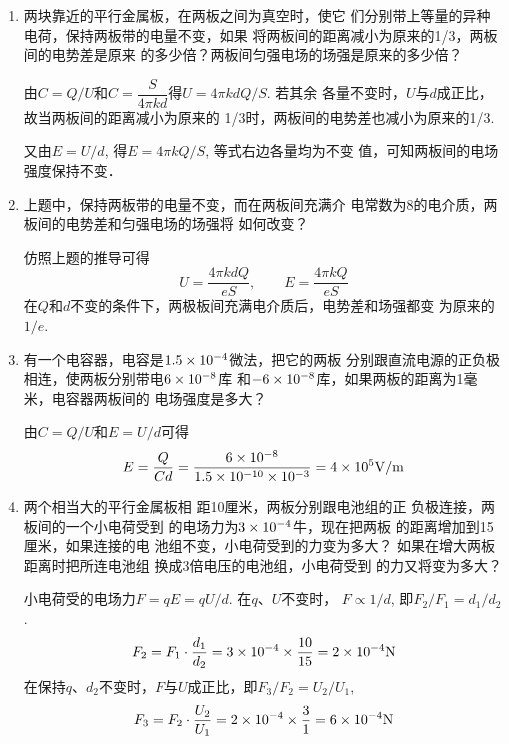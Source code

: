 \begin{enumerate}
\item 两块靠近的平行金属板，在两板之间为真空时，使它
们分别带上等量的异种电荷，保持两板带的电量不变，如果
将两板间的距离减小为原来的1/3，两板间的电势差是原来
的多少倍？两板间匀强电场的场强是原来的多少倍？

\begin{solution}
    由$C=Q/U$和$C=\dfrac{S}{4\pi kd}$得$U=4\pi kdQ/S$. 若其余
    各量不变时，$U$与$d$成正比，故当两板间的距离减小为原来的
    1/3时，两板间的电势差也减小为原来的1/3.

    又由$E=U/d$, 得$E=4\pi kQ/S$, 等式右边各量均为不变
值，可知两板间的电场强度保持不变．
\end{solution}

\item 上题中，保持两板带的电量不变，而在两板间充满介
电常数为8的电介质，两板间的电势差和匀强电场的场强将
如何改变？

\begin{solution}
    仿照上题的推导可得
    \[U=\frac{4\pi kdQ}{eS},\qquad E=\frac{4\pi kQ}{eS}\]
    在$Q$和$d$不变的条件下，两极板间充满电介质后，电势差和场强都变
    为原来的$1/e$.
\end{solution}

\item 有一个电容器，电容是$1.5\times10^{-4}$微法，把它的两板
分别跟直流电源的正负极相连，使两板分别带电$6\times10^{-8}$库
和$-6\times10^{-8}$库，如果两板的距离为1毫米，电容器两板间的
电场强度是多大？

\begin{solution}
    由$C=Q/U$和$E=U/d$可得
\[E=\frac{Q}{Cd}=\frac{6\times 10^{-8}}{1.5\times 10^{-10}\times 10^{-3}}=4\times 10^{5}{\rm V/m}\]
\end{solution}

\item 两个相当大的平行金属板相
距10厘米，两板分别跟电池组的正
负极连接，两板间的一个小电荷受到
的电场力为$3\times10^{-4}$牛，现在把两板
的距离增加到15厘米，如果连接的电
池组不变，小电荷受到的力变为多大？
如果在增大两板距离时把所连电池组
换成3倍电压的电池组，小电荷受到
的力又将变为多大？

\begin{solution}
    小电荷受的电场力$F=qE=qU/d$. 在$q$、$U$不变时，
    $F\propto 1/d$, 即$F_2/F_1=d_1/d_2$.
\[F_2=F_1\cdot \frac{d_1}{d_2}=3\times 10^{-4}\times \frac{10}{15}=2\times 10^{-4}{\rm N}\]
在保持$q$、$d_2$不变时，$F$与$U$成正比，即$F_3/F_2=U_2/U_1$,
\[F_3=F_2\cdot \frac{U_2}{U_1}=2\times 10^{-4}\times \frac{3}{1}=6\times 10^{-4}{\rm N}\]
\end{solution}



\end{enumerate}

